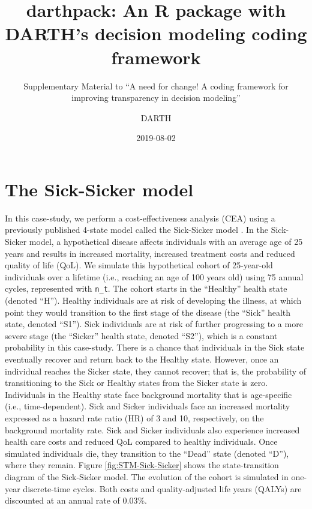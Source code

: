 \documentclass[]{book}
\title{darthpack: An R package with DARTH's decision modeling coding framework}
\subtitle{Supplementary Material to ``A need for change! A coding framework for improving transparency in decision modeling''}
\author{DARTH}
\date{2019-08-02}
\begin{document}
\maketitle

{
\setcounter{tocdepth}{1}
\tableofcontents
}
\hypertarget{the-sick-sicker-model}{%
\chapter*{The Sick-Sicker model}\label{the-sick-sicker-model}}

In this case-study, we perform a cost-effectiveness analysis (CEA) using a previously published 4-state model called the Sick-Sicker model \citep{Enns2015}. In the Sick-Sicker model, a hypothetical disease affects individuals with an average age of 25 years and results in increased mortality, increased treatment costs and reduced quality of life (QoL). We simulate this hypothetical cohort of 25-year-old individuals over a lifetime (i.e., reaching an age of 100 years old) using 75 annual cycles, represented with \texttt{n\_t}. The cohort starts in the ``Healthy'' health state (denoted ``H''). Healthy individuals are at risk of developing the illness, at which point they would transition to the first stage of the disease (the ``Sick'' health state, denoted ``S1''). Sick individuals are at risk of further progressing to a more severe stage (the ``Sicker'' health state, denoted ``S2''), which is a constant probability in this case-study. There is a chance that individuals in the Sick state eventually recover and return back to the Healthy state. However, once an individual reaches the Sicker state, they cannot recover; that is, the probability of transitioning to the Sick or Healthy states from the Sicker state is zero. Individuals in the Healthy state face background mortality that is age-specific (i.e., time-dependent). Sick and Sicker individuals face an increased mortality expressed as a hazard rate ratio (HR) of 3 and 10, respectively, on the background mortality rate. Sick and Sicker individuals also experience increased health care costs and reduced QoL compared to healthy individuals. Once simulated individuals die, they transition to the ``Dead'' state (denoted ``D''), where they remain. Figure \ref{fig:STM-Sick-Sicker} shows the state-transition diagram of the Sick-Sicker model. The evolution of the cohort is simulated in one-year discrete-time cycles. Both costs and quality-adjusted life years (QALYs) are discounted at an annual rate of 0.03\%.
\end{document}
